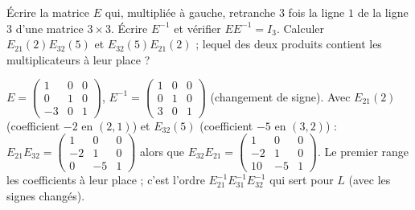 \begin{exo}
Écrire la matrice $E$ qui, multipliée à gauche, retranche $3$ fois la ligne $1$ de la ligne $3$ d'une matrice $3\times3$. Écrire $E^{-1}$ et vérifier $EE^{-1}=I_3$. Calculer $E_{21}(2)E_{32}(5)$ et $E_{32}(5)E_{21}(2)$ ; lequel des deux produits contient \og les multiplicateurs à leur place \fg ?
\begin{corrige}
$E=\begin{pmatrix}1&0&0\\0&1&0\\-3&0&1\end{pmatrix}$, $E^{-1}=\begin{pmatrix}1&0&0\\0&1&0\\3&0&1\end{pmatrix}$ (changement de signe). Avec $E_{21}(2)$ (coefficient $-2$ en $(2,1)$) et $E_{32}(5)$ (coefficient $-5$ en $(3,2)$) : $E_{21}E_{32}=\begin{pmatrix}1&0&0\\-2&1&0\\0&-5&1\end{pmatrix}$ alors que $E_{32}E_{21}=\begin{pmatrix}1&0&0\\-2&1&0\\10&-5&1\end{pmatrix}$. Le premier range les coefficients à leur place ; c'est l'ordre \og $E_{21}^{-1}E_{31}^{-1}E_{32}^{-1}$ \fg{} qui sert pour $L$ (avec les signes changés).
\end{corrige}
\end{exo}
